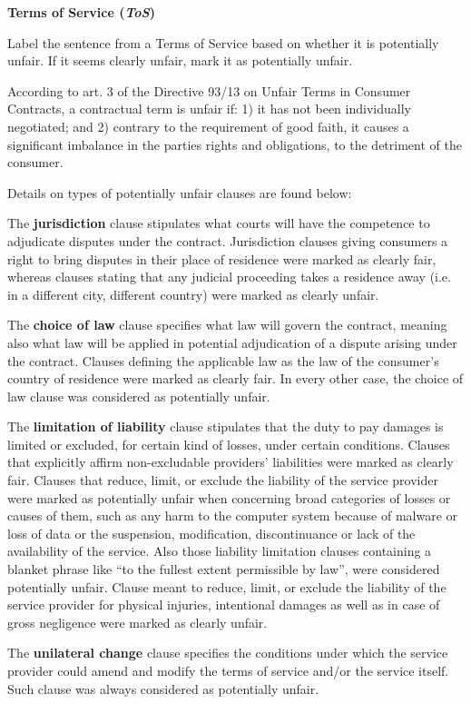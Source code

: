 \documentclass{article}
\begin{document}
\textbf{Terms of Service (\textit{ToS})}

Label the sentence from a Terms of Service based on whether it is potentially unfair. If it seems clearly unfair, mark it as potentially unfair.

According to art. 3 of the Directive 93/13 on Unfair Terms in Consumer Contracts, a contractual term is unfair if: 1) it has not been individually negotiated; and 2) contrary to the requirement of good faith, it causes a significant imbalance in the parties rights and obligations, to the detriment of the consumer. 

Details on types of potentially unfair clauses are found below:


The \textbf{jurisdiction} clause stipulates what courts will have the competence to adjudicate disputes under the contract. Jurisdiction clauses giving consumers a right to bring disputes in their place of residence were marked as clearly fair, whereas clauses stating that any judicial proceeding takes a residence away (i.e. in a different city, different country) were marked as clearly unfair.


The \textbf{choice of law} clause specifies what law will govern the contract, meaning also what law will be applied in potential adjudication of a dispute arising under the contract. Clauses defining the applicable law as the law of the consumer’s country of residence were marked as clearly fair. In every other case, the choice of law clause was considered as potentially unfair.


The \textbf{limitation of liability} clause stipulates that the duty to pay damages is limited or excluded, for certain kind of losses, under certain conditions. Clauses that explicitly affirm non-excludable providers’ liabilities were marked as clearly fair. Clauses that reduce, limit, or exclude the liability of the service provider were marked as potentially unfair when concerning broad categories of losses or causes of them, such as any harm to the computer system because of malware or loss of data or the suspension, modification, discontinuance or lack of the availability of the service. Also those liability limitation clauses containing a blanket phrase like “to the fullest extent permissible by law”, were considered potentially unfair. Clause meant to reduce, limit, or exclude the liability of the service provider for physical injuries, intentional damages as well as in case of gross negligence were marked as clearly unfair.


The \textbf{unilateral change} clause specifies the conditions under which the service provider could amend and modify the terms of service and/or the service itself. Such clause was always considered as potentially unfair.
\end{document}

